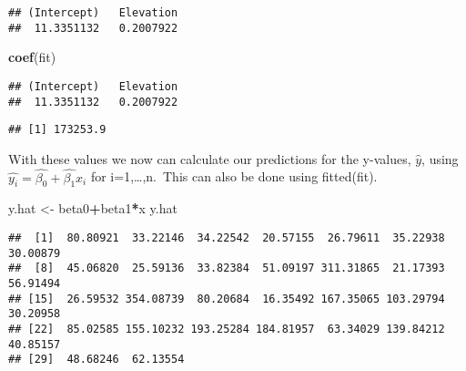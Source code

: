 \documentclass[
]{article}
\newenvironment{Shaded}{\begin{snugshade}}{\end{snugshade}}
\newcommand{\DecValTok}[1]{\textcolor[rgb]{0.00,0.00,0.81}{#1}}
\newcommand{\FunctionTok}[1]{\textcolor[rgb]{0.13,0.29,0.53}{\textbf{#1}}}
\newcommand{\NormalTok}[1]{#1}
\newcommand{\OtherTok}[1]{\textcolor[rgb]{0.56,0.35,0.01}{#1}}
\newcommand{\SpecialCharTok}[1]{\textcolor[rgb]{0.81,0.36,0.00}{\textbf{#1}}}
\begin{document}
\begin{Shaded}
\end{Shaded}

\begin{verbatim}
## (Intercept)   Elevation 
##  11.3351132   0.2007922
\end{verbatim}

\begin{Shaded}
\begin{Highlighting}[]
\FunctionTok{coef}\NormalTok{(fit)}
\end{Highlighting}
\end{Shaded}

\begin{verbatim}
## (Intercept)   Elevation 
##  11.3351132   0.2007922
\end{verbatim}

\begin{Shaded}
\end{Shaded}

\begin{verbatim}
## [1] 173253.9
\end{verbatim}

With these values we now can calculate our predictions for the y-values,
\(\hat{y}\), using \(\hat{y_i}=\hat{\beta_0}+\hat{\beta_1}x_i\) for
i=1,\ldots,n.~This can also be done using fitted(fit).

\begin{Shaded}
\begin{Highlighting}[]
\NormalTok{y.hat }\OtherTok{\textless{}{-}}\NormalTok{ beta0}\SpecialCharTok{+}\NormalTok{beta1}\SpecialCharTok{*}\NormalTok{x}
\NormalTok{y.hat}
\end{Highlighting}
\end{Shaded}

\begin{verbatim}
##  [1]  80.80921  33.22146  34.22542  20.57155  26.79611  35.22938  30.00879
##  [8]  45.06820  25.59136  33.82384  51.09197 311.31865  21.17393  56.91494
## [15]  26.59532 354.08739  80.20684  16.35492 167.35065 103.29794  30.20958
## [22]  85.02585 155.10232 193.25284 184.81957  63.34029 139.84212  40.85157
## [29]  48.68246  62.13554
\end{verbatim}
\end{document}

